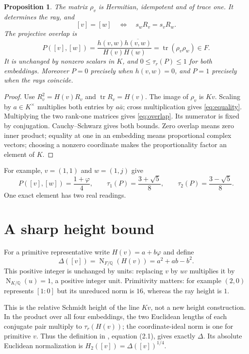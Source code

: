 \documentclass[11pt,a4paper]{article}
\newtheorem{proposition}{Proposition}
\newcommand{\Q}{\mathbb Q}
\newcommand{\ph}{\varphi}
\newcommand{\Nm}{\operatorname{N}}
\newcommand{\tr}{\operatorname{tr}}
\begin{document}
\begin{proposition}\label{prop:projector}
The matrix $\rho_v$ is Hermitian, idempotent and of trace one.
It determines the ray, and
\begin{equation}\label{eq:equality}
 [v]=[w]\quad\Longleftrightarrow\quad s_wR_v=s_vR_w.
\end{equation}
The projective overlap is
\begin{equation}\label{eq:overlap}
 P([v],[w])=\frac{h(v,w)\overline{h(v,w)}}{H(v)H(w)}
 =\tr(\rho_v\rho_w)\in F.
\end{equation}
It is unchanged by nonzero scalars in $K$, and
$0\leq\tau_r(P)\leq1$ for both embeddings.
Moreover $P=0$ precisely when $h(v,w)=0$, and $P=1$ precisely
when the rays coincide.
\end{proposition}
\begin{proof}
Use $R_v^2=H(v)R_v$ and $\tr R_v=H(v)$.
The image of $\rho_v$ is $Kv$. Scaling by $a\in K^\times$ multiplies
both entries by $a\bar a$; cross multiplication gives
\eqref{eq:equality}. Multiplying the two rank-one matrices gives
\eqref{eq:overlap}. Its numerator is fixed by conjugation.
Cauchy--Schwarz gives both bounds. Zero overlap means zero inner
product; equality at one in an embedding
means proportional complex vectors; choosing a nonzero coordinate
makes the proportionality factor an element of $K$.
\end{proof}

For example, $v=(1,1)$ and $w=(1,j)$ give
\begin{equation}\label{eq:example}
 P([v],[w])=\frac{1+\ph}{4},\qquad
 \tau_1(P)=\frac{3+\sqrt5}{8},\qquad
 \tau_2(P)=\frac{3-\sqrt5}{8}.
\end{equation}
One exact element has two real readings.

\section{A sharp height bound}\label{sec:height}
For a primitive representative write $H(v)=a+b\ph$ and define
\begin{equation}\label{eq:height}
 \Delta([v])=\Nm_{F/\Q}(H(v))=a^2+ab-b^2.
\end{equation}
This positive integer is unchanged by units: replacing $v$ by $uv$
multiplies it by $\Nm_{K/\Q}(u)=1$, a positive integer unit.
Primitivity matters: for example $(2,0)$ represents $[1:0]$ but
its unreduced norm is $16$, whereas the ray height is $1$.

This is the relative Schmidt height of the line $Kv$, not a new
height construction. In the product over all four embeddings, the
two Euclidean lengths of each conjugate pair multiply to
$\tau_r(H(v))$; the coordinate-ideal norm is one for primitive
$v$. Thus the definition in \cite{poels}, equation (2.1), gives
exactly $\Delta$. Its absolute Euclidean normalization is
$H_2([v])=\Delta([v])^{1/4}$.
\end{document}
